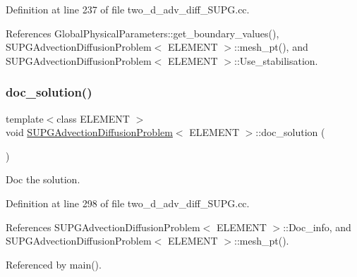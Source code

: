 Definition at line 237 of file two\+\_\+d\+\_\+adv\+\_\+diff\+\_\+\+S\+U\+P\+G.\+cc.



References Global\+Physical\+Parameters\+::get\+\_\+boundary\+\_\+values(), S\+U\+P\+G\+Advection\+Diffusion\+Problem$<$ E\+L\+E\+M\+E\+N\+T $>$\+::mesh\+\_\+pt(), and S\+U\+P\+G\+Advection\+Diffusion\+Problem$<$ E\+L\+E\+M\+E\+N\+T $>$\+::\+Use\+\_\+stabilisation.

\mbox{\label{classSUPGAdvectionDiffusionProblem_a3133ba26f0917f5d210d69ea0ddcb1fe}} 
\subsubsection{\texorpdfstring{doc\+\_\+solution()}{doc\_solution()}}
{\footnotesize\ttfamily template$<$class E\+L\+E\+M\+E\+NT $>$ \\
void \hyperlink{classSUPGAdvectionDiffusionProblem}{S\+U\+P\+G\+Advection\+Diffusion\+Problem}$<$ E\+L\+E\+M\+E\+NT $>$\+::doc\+\_\+solution (\begin{DoxyParamCaption}{ }\end{DoxyParamCaption})}



Doc the solution. 



Definition at line 298 of file two\+\_\+d\+\_\+adv\+\_\+diff\+\_\+\+S\+U\+P\+G.\+cc.



References S\+U\+P\+G\+Advection\+Diffusion\+Problem$<$ E\+L\+E\+M\+E\+N\+T $>$\+::\+Doc\+\_\+info, and S\+U\+P\+G\+Advection\+Diffusion\+Problem$<$ E\+L\+E\+M\+E\+N\+T $>$\+::mesh\+\_\+pt().



Referenced by main().

\mbox{\label{classSUPGAdvectionDiffusionProblem_ac54d5c05b91ca542e66760b2f1dd67c9}} 
